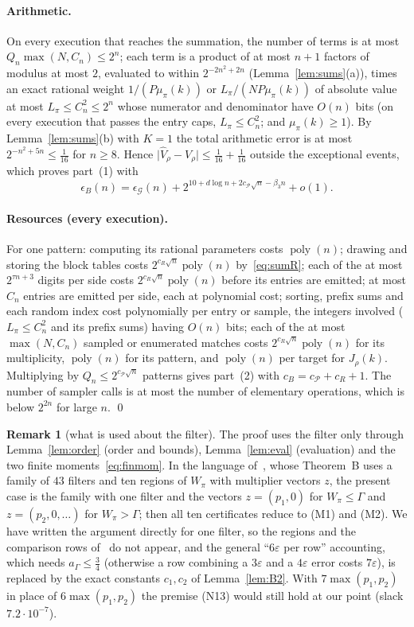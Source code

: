 \documentclass[11pt]{article}
\theoremstyle{definition}
\newtheorem{remark}[lemma]{Remark}
\newcommand{\eps}{\varepsilon}
\newcommand{\abs}[1]{\lvert #1\rvert}
\newcommand{\poly}{\operatorname{poly}}
\newcommand{\cG}{\mathcal G}
\newcommand{\cP}{\mathcal P}
\begin{document}
\paragraph{Arithmetic.} On every execution that reaches the summation, the number of terms is at most
$Q_n\max(N,C_n)\le2^{n}$; each term is a product of at most $n+1$ factors of modulus at most $2$, evaluated to within
$2^{-2n^2+2n}$ (Lemma~\ref{lem:sums}(a)), times an exact rational weight $1/(P\mu_\pi(k))$ or $L_\pi/(NP\mu_\pi(k))$ of
absolute value at most $L_\pi\le C_n^2\le2^{n}$ whose numerator and denominator have $O(n)$ bits (on every execution
that passes the entry caps, $L_\pi\le C_n^2$; and $\mu_\pi(k)\ge1$). By Lemma~\ref{lem:sums}(b) with $K=1$ the total
arithmetic error is at most $2^{-n^2+5n}\le\tfrac1{16}$ for $n\ge8$. Hence
$\abs{\hat V_\rho-V_\rho}\le\tfrac1{16}+\tfrac1{16}$ outside the exceptional events, which proves part~(1) with
\[
 \epsilon_B(n)=\epsilon_{\cG}(n)+2^{10+d\log n+2c_{\cP}\sqrt n-\beta_3n}+o(1).
\]

\paragraph{Resources (every execution).} For one pattern: computing its rational parameters costs $\poly(n)$;
drawing and storing the block tables costs $2^{c_R\sqrt n}\poly(n)$ by~\eqref{eq:sumR}; each of the at most
$2^{\tau n+3}$ digits per side costs $2^{c_R\sqrt n}\poly(n)$ before its entries are emitted; at most $C_n$ entries
are emitted per side, each at polynomial cost; sorting, prefix sums and each random index cost polynomially per
entry or sample, the integers involved ($L_\pi\le C_n^2$ and its prefix sums) having $O(n)$ bits; each of the at
most $\max(N,C_n)$ sampled or enumerated matches costs $2^{c_R\sqrt n}\poly(n)$ for its multiplicity, $\poly(n)$ for
its pattern, and $\poly(n)$ per target for $J_\rho(k)$. Multiplying by $Q_n\le2^{c_{\cP}\sqrt n}$ patterns gives
part~(2) with $c_B=c_{\cP}+c_R+1$. The number of sampler calls is at most the number of elementary operations,
which is below $2^{2n}$ for large $n$. \qed

\begin{remark}[what is used about the filter]\label{rem:onefilter}
The proof uses the filter only through Lemma~\ref{lem:order} (order and bounds), Lemma~\ref{lem:eval} (evaluation)
and the two finite moments~\eqref{eq:finmom}. In the language of~\cite{Base}, whose Theorem~B uses a family of $43$
filters and ten regions of $W_\pi$ with multiplier vectors $z$, the present case is the family with one filter and
the vectors $z=(p_1,0)$ for $W_\pi\le\Gamma$ and $z=(p_2,0,\dots)$ for $W_\pi>\Gamma$; then all ten certificates
reduce to \textup{(M1)} and \textup{(M2)}. We have written the argument directly for one filter, so the regions and
the comparison rows of~\cite{Base} do not appear, and the general ``$6\eps$ per row'' accounting, which
needs $a_\Gamma\le\tfrac34$ (otherwise a row combining a $3\eps$ and a $4\eps$ error costs $7\eps$), is replaced by
the exact constants $c_1,c_2$ of Lemma~\ref{lem:B2}. With $7\max(p_1,p_2)$ in place of $6\max(p_1,p_2)$ the
premise \textup{(N13)} would still hold at our point (slack $7.2\cdot10^{-7}$).
\end{remark}
\end{document}
